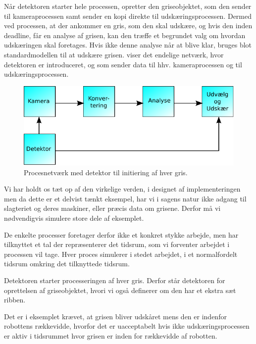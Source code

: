 Når detektoren starter hele processen, opretter den griseobjektet, som den sender til kameraprocessen samt sender en kopi direkte til udskæringsprocessen. Dermed ved processen, at der ankommer en gris, som den skal udskære, og hvis den inden deadline, får en analyse af grisen, kan den træffe et begrundet valg om hvordan udskæringen skal foretages. Hvis ikke denne analyse når at blive klar, bruges blot standardmodellen til at udskære grisen.  viser det endelige  netværk, hvor detektoren er introduceret, og som sender data til hhv. kameraprocessen og til udskæringsprocessen. 

\begin{figure}
 \begin{center}
  \includegraphics[scale=1]{images/pig-network2}
	\caption{Procesnetværk med detektor til initiering af hver gris.}
	\label{fig:pig-network2}
\end{center}
\end{figure}

Vi har holdt os tæt op af den virkelige verden, i designet af implementeringen men da dette er et delvist tænkt eksempel, har vi i  sagens natur ikke  adgang til slagteriet og deres maskiner, eller præcis data om grisene. Derfor må vi nødvendigvis simulere store dele af eksemplet. 

De enkelte processer foretager derfor ikke et konkret stykke arbejde, men har  tilknyttet et tal der repræsenterer det tidsrum, som vi forventer arbejdet i processen vil tage. Hver proces simulerer i stedet arbejdet, i et normalfordelt tidsrum omkring det tilknyttede tidsrum.

Detektoren starter processeringen af hver gris. Derfor står detektoren for oprettelsen af griseobjektet, hvori vi også  definerer om den har et ekstra sæt ribben. 

Det er i eksemplet  krævet, at grisen bliver udskåret mens den er indenfor robottens rækkevidde, hvorfor det er uacceptabelt hvis ikke udskæringsprocessen er aktiv i tidsrummet hvor grisen er inden for rækkevidde af robotten. 

